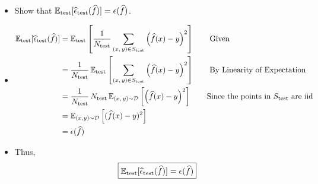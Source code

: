 \begin{itemize}
    \item Show that $\mathbb{E}_{\textrm{test}}[ \widehat{\epsilon}_{\textrm{test}}(\widehat{f}) ] = \epsilon(\widehat{f})$.
    \item[] 
	\begin{align*}
	    \E_{\textrm{test}}[ \widehat{\epsilon}_{\textrm{test}}(\widehat{f}) ] 
		&=  \E_{\textrm{test}} \left[ \frac{1}{N_{\textrm{test}}} \sum_{(x, \, y)\in S_{\textrm{test}}} \left( \widehat{f}(x) - y \right)^2 \right] \tag*{Given} \\
		&= \frac{1}{N_{\textrm{test}}} \, \E_{\textrm{test}} \left[  \sum_{(x, \, y)\in S_{\textrm{test}}} \left( \widehat{f}(x) - y \right)^2 \right] \tag*{By Linearity of Expectation} \\
		&= \frac{1}{N_{\textrm{test}}} \, N_{\textrm{test}} \, \E_{(x,\, y) \sim \mathcal{D}} \left[  \left( \widehat{f}(x) - y \right)^2 \right] \tag*{Since the points in $S_{\textrm{test}}$ are iid} \\
		&= \E_{(x,y) \sim \mathcal{D}} \left[ (\widehat{f}(x) -y)^2 \right] \\
		&= \epsilon(\widehat{f})
	\end{align*}
    \item[] Thus, $$\boxed{ \mathbb{E}_{\textrm{test}}[ \widehat{\epsilon}_{\textrm{test}}(\widehat{f}) ] = \epsilon(\widehat{f}) } $$
\end{itemize}

